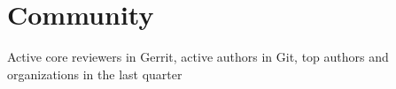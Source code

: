 \section{Community}
Active core reviewers in Gerrit, active authors in Git, top authors and organizations in the last quarter
